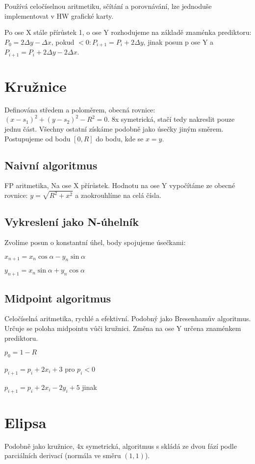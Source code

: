 \documentclass[a4paper, 11pt]{report}
\begin{document}
Používá celočíselnou aritmetiku, sčítání a porovnávání, lze jednoduše implementovat v HW grafické karty.

Po ose X stále přírůstek 1, o ose Y rozhodujeme na základě znaménka prediktoru: $P_0 = 2 \Delta y - \Delta x$, pokud $ < 0: P_{i+1} = P_i + 2\Delta y$, jinak posun p ose Y a $P_{i+1} = P_i + 2\Delta y - 2 \Delta x$.

\section{Kružnice}

Definována středem a poloměrem, obecná rovnice: $(x-s_1)^2 + (y-s_2)^2 - R^2 = 0$. 8x symetrická, stačí tedy nakreslit pouze jednu část. Všechny ostatní získáme podobně jako úsečky jiným směrem. Postupujeme od bodu $[0, R]$ do bodu, kde se $x = y$.

\subsection{Naivní algoritmus}
FP aritmetika, Na ose X přírůstek. Hodnotu na ose Y vypočítáme ze obecné rovnice: $y = \sqrt{R^2 + x^2}$ a zaokrouhlíme na celá čísla.

\subsection{Vykreslení jako N-úhelník}

Zvolíme posun o konstantní úhel, body spojujeme úsečkami:

$x_{n+1} = x_n \cos{\alpha} - y_n \sin{\alpha}$

$y_{n+1} = x_n \sin{\alpha} + y_n \cos{\alpha}$

\subsection{Midpoint algoritmus}

Celočíselná aritmetika, rychlé a  efektivní. Podobný jako Bresenhamův algoritmus. Určuje se poloha midpointu vůči kružnici. Změna na ose Y určena znaménkem prediktoru.

$p_0 = 1-R$

$p_{i+1} = p_i + 2 x_i + 3$ pro $p_i < 0$

$p_{i+1} = p_i + 2 x_i - 2y_i + 5$ jinak

\section{Elipsa}
Podobně jako kružnice, 4x symetrická, algoritmus s skládá ze dvou fází podle parciálních derivací (normála ve směru $(1,1)$).
\end{document}
